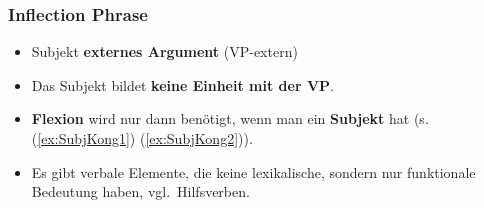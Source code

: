 \begin{frame}
\frametitle{Inflection Phrase}

\begin{itemize}
		\item Subjekt \ras \textbf{externes Argument} (VP-extern)

		\item Das Subjekt bildet \textbf{keine Einheit mit der VP}.	

		\z

\pause

		\item \textbf{Flexion} wird nur dann benötigt, wenn man ein \textbf{Subjekt} hat	(s. (\ref{ex:SubjKong1}) \vs (\ref{ex:SubjKong2})).	

		\label{ex:SubjKong1}
			
		\label{ex:SubjKong2}
		\z
		
		\item Es gibt verbale Elemente, die keine lexikalische, sondern nur funktionale Bedeutung haben, vgl.~Hilfsverben.

\end{itemize}

\end{frame}


